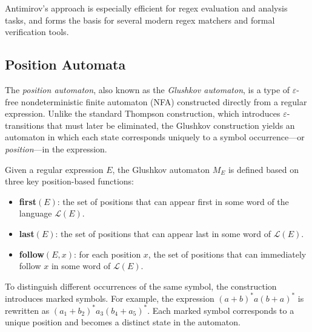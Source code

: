 Antimirov's approach is especially efficient for regex evaluation and analysis tasks, and forms the basis for several modern regex matchers and formal verification tools.

\subsection{Position Automata}


The \emph{position automaton}, also known as the \emph{Glushkov automaton}, is a type of $\varepsilon$-free nondeterministic finite automaton (NFA) constructed directly from a regular expression. Unlike the standard Thompson construction, which introduces $\varepsilon$-transitions that must later be eliminated, the Glushkov construction yields an automaton in which each state corresponds uniquely to a symbol occurrence---or \emph{position}---in the expression. \cite{mesh-of-automata}

Given a regular expression $E$, the Glushkov automaton $M_E$ is defined based on three key position-based functions:

\begin{itemize}
    \item \textbf{first$(E)$}: the set of positions that can appear first in some word of the language $\mathcal{L}(E)$.
    \item \textbf{last$(E)$}: the set of positions that can appear last in some word of $\mathcal{L}(E)$.
    \item \textbf{follow$(E, x)$}: for each position $x$, the set of positions that can immediately follow $x$ in some word of $\mathcal{L}(E)$.
\end{itemize}

To distinguish different occurrences of the same symbol, the construction introduces marked symbols. For example, the expression $(a + b)^*a(b + a)^*$ is rewritten as $(a_1 + b_2)^*a_3(b_4 + a_5)^*$. Each marked symbol corresponds to a unique position and becomes a distinct state in the automaton.

